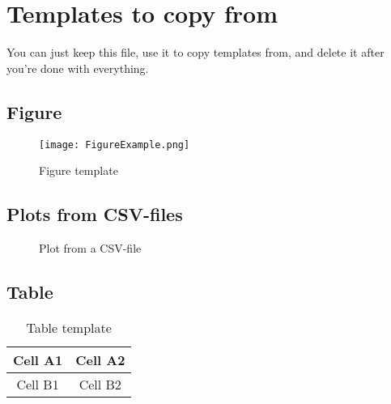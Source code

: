 \chapter*{Templates to copy from}

You can just keep this file, use it to copy templates from, and delete it after you're done with everything.





\section*{Figure}

\begin{figure}[H]
    \centering
    \texttt{[image: FigureExample.png]}
    \caption{Figure template}
    \label{fig:template}
\end{figure}

\section*{Plots from CSV-files}

\begin{figure}[H]
    \centering
    \caption{Plot from a CSV-file}
    \label{fig:exampleplot}
\end{figure}





\section*{Table}

\begin{table}[H]
    \centering
    \caption{Table template}
    \label{tab:template}
    \begin{tabular}{|c|c|}
        \hline
        Cell A1 & Cell A2 \\
        \hline
        Cell B1 & Cell B2 \\
        \hline
    \end{tabular}
\end{table}





